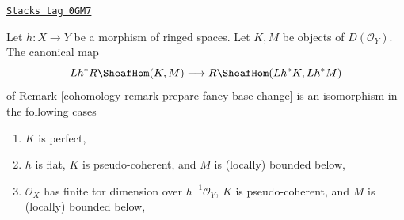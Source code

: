 \begin{lemma}
\label{cohomology-lemma-pullback-internal-hom}
\href{https://stacks.math.columbia.edu/tag/0GM7}{\texttt{Stacks tag 0GM7}}

Let $h : X \to Y$ be a morphism of ringed spaces.
Let $K, M$ be objects of $D(\mathcal{O}_Y)$. The
canonical map
$$
Lh^*R\SheafHom(K, M) \longrightarrow R\SheafHom(Lh^*K, Lh^*M)
$$
of Remark \ref{cohomology-remark-prepare-fancy-base-change}
is an isomorphism in the following cases
\begin{enumerate}
\item $K$ is perfect,
\item $h$ is flat, $K$ is pseudo-coherent, and $M$ is (locally) bounded below,
\item $\mathcal{O}_X$ has finite tor dimension over $h^{-1}\mathcal{O}_Y$,
$K$ is pseudo-coherent, and $M$ is (locally) bounded below,
\end{enumerate}
\end{lemma}

